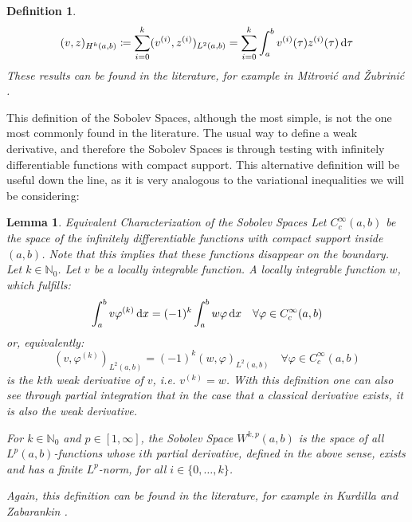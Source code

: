 \documentclass[headsepline,footsepline,footinclude=false,oneside,fontsize=11pt,paper=a4,listof=totoc,bibliography=totoc]{scrbook} %
\newtheorem{lemma}{Lemma}
\newtheorem{definition}{Definition}
\begin{document}
\begin{definition}
	\begin{equation}
	(v,z)_{H^k(a,b)} \coloneqq \sum_{i=0}^{k} (v^{(i)}, z^{(i)})_{L^2(a,b)} = \sum_{i=0}^{k} \int_a^b v^{(i)}(\tau)z^{(i)}(\tau) \dif \tau \label{eq:sobolev1_inner_product}
	\end{equation}
	These results can be found in the literature, for example in Mitrović and Žubrinić \cite[Chapter 5, Section 2, Remark 2]{mitrovic1997fundamentals}.
\end{definition}

This definition of the Sobolev Spaces, although the most simple, is not the one most commonly found in the literature. The usual way to define a weak derivative, and therefore the Sobolev Spaces is through testing with infinitely differentiable functions with compact support. This alternative definition will be useful down the line, as it is very analogous to the variational inequalities we will be considering:

\begin{lemma} Equivalent Characterization of the Sobolev Spaces \newline
	Let $C_c^\infty(a,b)$ be the space of the infinitely differentiable functions with compact support inside $(a,b)$. Note that this implies that these functions disappear on the boundary. Let $k \in \mathbb{N}_0$. Let $v$ be a locally integrable function. A locally integrable function $w$, which fulfills:
	\begin{equation} \label{eq:weak_derivative_through_testing}
	\int_a^b v \varphi^{(k)} \dif x = (-1)^k \int_a^b w \varphi \dif x \quad \forall \varphi \in C_c^\infty(a,b)
	\end{equation}
	or, equivalently:
	\begin{equation}
		(v,\varphi^{(k)})_{L^2(a,b)} = (-1)^k (w,\varphi)_{L^2(a,b)} \quad \forall \varphi \in C_c^\infty(a,b)
	\end{equation}
	is the $k$th weak derivative of $v$, i.e. $v^{(k)} = w$. With this definition one can also see through partial integration that in the case that a classical derivative exists, it is also the weak derivative.
	
	 For $k \in \mathbb{N}_0$ and $p\in [1,\infty]$, the Sobolev Space $W^{k,p}(a,b)$ is the space of all $L^p(a,b)$-functions whose $i$th partial derivative, defined in the above sense, exists and has a finite $L^p$-norm, for all $i \in \{0,\dots,k\}$. 
	
	
	Again, this definition can be found in the literature, for example in Kurdilla and Zabarankin \cite[Definition 3.2.3]{kurdila2005convex}.
\end{lemma}
\end{document}
